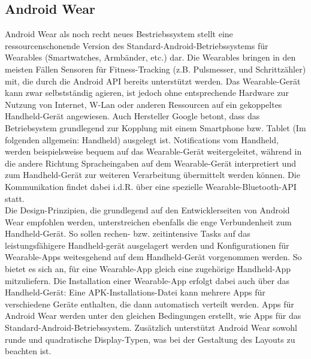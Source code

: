 \subsection{Android Wear}
Android Wear als noch recht neues Bestriebssystem stellt eine ressourcenschonende Version
des Standard-Android-Betriebssystems für Wearables (Smartwatches, Armbänder, etc.) dar. 
Die Wearables bringen in den meisten Fällen Sensoren für Fitness-Tracking (z.B. Pulsmesser,
und Schrittzähler) mit, die durch die Android API bereits unterstützt werden. Das Wearable-Gerät 
kann zwar selbstständig agieren, ist jedoch ohne entsprechende Hardware zur Nutzung von Internet,
W-Lan oder anderen Ressourcen auf ein gekoppeltes Handheld-Gerät angewiesen. Auch Hersteller
Google betont, dass das Betriebsystem grundlegend zur Kopplung mit einem Smartphone bzw. Tablet
(Im folgenden allgemein: Handheld) ausgelegt ist. Notifications vom Handheld, werden beispielsweise
bequem auf das Wearable-Gerät weitergeleitet, während in die andere Richtung Spracheingaben auf dem
Wearable-Gerät interpretiert und zum Handheld-Gerät zur weiteren Verarbeitung übermittelt werden können.
Die Kommunikation findet dabei i.d.R. über eine spezielle Wearable-Bluetooth-API statt.
\\[0.5cm]
Die Design-Prinzipien, die grundlegend auf den Entwicklerseiten von Android Wear empfohlen werden,
unterstreichen ebenfalls die enge Verbundenheit zum Handheld-Gerät. So sollen rechen- bzw. zeitintensive
Tasks auf das leistungsfähigere Handheld-gerät ausgelagert werden und Konfigurationen für
Wearable-Apps weitesgehend auf dem Handheld-Gerät vorgenommen werden. So bietet es sich an,
für eine Wearable-App gleich eine zugehörige Handheld-App mitzuliefern. Die Installation einer
Wearable-App erfolgt dabei auch über das Handheld-Gerät: Eine APK-Installations-Datei kann mehrere
Apps für verschiedene Geräte enthalten, die dann automatisch verteilt werden. Apps für Android Wear werden unter den gleichen Bedingungen erstellt, wie Apps für das Standard-Android-Betriebssystem. Zusätzlich unterstützt Android Wear sowohl runde und quadratische Display-Typen, was bei der Gestaltung des Layouts zu beachten ist.




